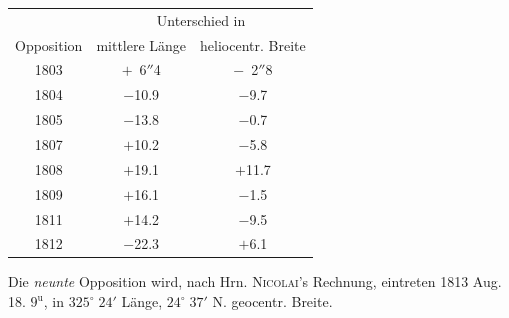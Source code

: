 \begin{center}
\fontsize{10}{12}\selectfont\setlength{\tabcolsep}{7pt}\renewcommand{\arraystretch}{1.15}\begin{tabular}{c|c|c}
 & \multicolumn{2}{c}{Unterschied in} \\
Opposition & mittlere Länge & heliocentr. Breite \\
\hline
1803 & $+$\ 6$''$4  & $-$\ 2$''$8 \\
1804 & $-$10.9 & $-$9.7 \\
1805 & $-$13.8 & $-$0.7 \\
1807 & $+$10.2 & $-$5.8 \\
1808 & $+$19.1 & $+$11.7 \\
1809 & $+$16.1 & $-$1.5 \\
1811 & $+$14.2 & $-$9.5 \\
1812 & $-$22.3 & $+$6.1 \\
\end{tabular}
\end{center}

\par\indent Die \emph{neunte} Opposition wird, nach Hrn. \textsc{Nicolai}'s Rechnung, eintreten
1813 Aug. 18. $9^{\mathrm u}$, in $325^\circ\;24'$ Länge, $24^\circ\;37'$
N. geocentr. Breite.
